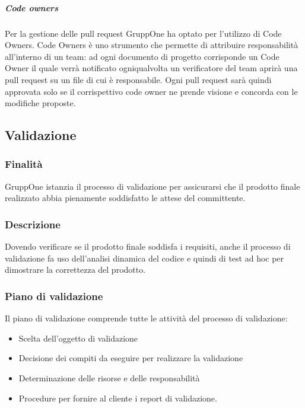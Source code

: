 \documentclass[../norme-di-progetto.tex]{subfiles}
\begin{document}
\subparagraph{Code owners}%
\label{subp:code_owners}

Per la gestione delle pull request GruppOne ha optato per l'utilizzo di Code Owners. Code Owners è uno strumento che permette di attribuire responsabilità all'interno di un team: ad ogni documento di progetto corrisponde un Code Owner il quale verrà notificato ogniqualvolta un verificatore del team aprirà una pull request su un file di cui è responsabile. Ogni pull request sarà quindi approvata solo se il corrispettivo code owner ne prende visione e concorda con le modifiche proposte.

\subsection{Validazione}%
\label{sub:validazione}

\subsubsection{Finalità}%
\label{subs:validazione/finalita}

GruppOne istanzia il processo di validazione per assicurarsi che il prodotto finale realizzato abbia pienamente soddisfatto le attese del committente.

\subsubsection{Descrizione}%
\label{subs:validazione/descrizione}

Dovendo verificare se il prodotto finale soddisfa i requisiti, anche il processo di validazione fa uso dell'analisi dinamica del codice e quindi di test ad hoc per dimostrare la correttezza del prodotto.

\subsubsection{Piano di validazione}%
\label{subs:piano_di_validazione}

Il piano di validazione comprende tutte le attività del processo di validazione:

\begin{itemize}
  \item Scelta dell'oggetto di validazione
  \item Decisione dei compiti da eseguire per realizzare la validazione
  \item Determinazione delle risorse e delle responsabilità
  \item Procedure per fornire al cliente i report di validazione.
 \end{itemize}

 
\end{document}

